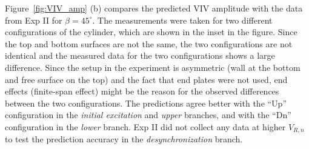 Figure~\ref{fig:VIV_amp} (b) compares the predicted VIV amplitude with the data
from Exp II for $\beta=45^\circ$. The measurements were taken for two
different configurations of the cylinder, which are shown in the inset in the
figure. Since the top and bottom surfaces are not the same, the two
configurations are not identical and the measured data for the two
configurations shows a large difference. Since the setup in the experiment is
asymmetric (wall at the bottom and free surface on the top) and the fact that
end plates were not used, end effects (finite-span effect) might be the reason
for the observed differences between the two configurations. The predictions
agree better with the ``Up'' configuration in the {\em initial excitation} and
{\em upper} branches, and with the ``Dn'' configuration in the {\em lower}
branch. Exp II did not collect any data at higher $V_{R,n}$ to test the
prediction accuracy in the {\em desynchronization} branch.

